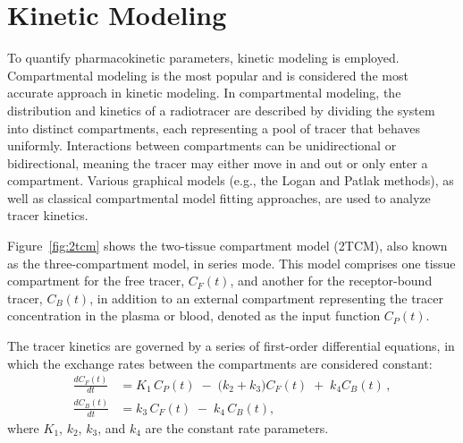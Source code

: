 \section{Kinetic Modeling}
To quantify pharmacokinetic parameters, kinetic modeling is employed.
Compartmental modeling is the most popular and is considered the most accurate approach in kinetic modeling.
In compartmental modeling, the distribution and kinetics of a radiotracer are described by dividing the system into distinct compartments, each representing a pool of tracer that behaves uniformly.
Interactions between compartments can be unidirectional or bidirectional, meaning the tracer may either move in and out or only enter a compartment.
Various graphical models (e.g., the Logan \cite{logan1990graphical} and Patlak \cite{patlak1983graphical} methods), as well as classical compartmental model fitting approaches, are used to analyze tracer kinetics.

Figure~\ref{fig:2tcm} shows the two-tissue compartment model (2TCM), also known as the three-compartment model, in series mode.
This model comprises one tissue compartment for the free tracer, \(C_F(t)\), and another for the receptor-bound tracer, \(C_B(t)\), in addition to an external compartment representing the tracer concentration in the plasma or blood, denoted as the input function \(C_P(t)\).

The tracer kinetics are governed by a series of first-order differential equations, in which the exchange rates between the compartments are considered constant:
\begin{align}
	\frac{dC_F(t)}{dt} & = K_1 \, C_P(t) \;-\; \bigl(k_2 + k_3\bigr) C_F(t) \;+\; k_4 C_B(t) \,, \label{eq:2tcm-c1} \\[6pt]
	\frac{dC_B(t)}{dt} & = k_3 \, C_F(t) \;-\; k_4 \, C_B(t), \label{eq:2tcm-c2}
\end{align}
where \(K_1\), \(k_2\), \(k_3\), and \(k_4\) are the constant rate parameters.

